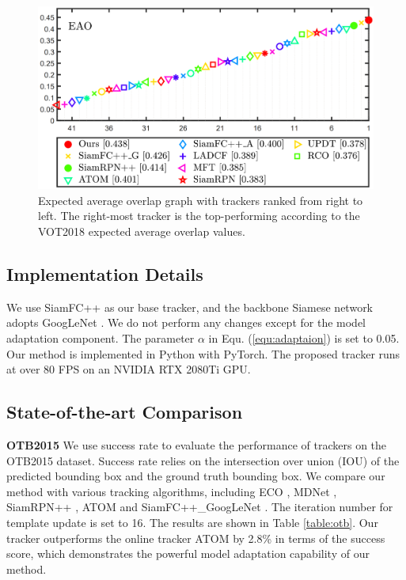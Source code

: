 \begin{figure}[t]
    \centering
    \includegraphics[width=1.0\textwidth]{Img/MTP/vot18/vot18_eao.png}
    \caption{Expected average overlap graph with trackers ranked from right to left. The right-most tracker is the top-performing according to the VOT2018 expected average overlap values.}
    \label{fig:eao}
\end{figure}

\subsection{Implementation Details}
We use SiamFC++ \cite{SiamFC++} as our base tracker, and the backbone Siamese network adopts GoogLeNet \cite{szegedy2015going}. We do not perform any changes except for the model adaptation component. The parameter $\alpha$ in Equ. (\ref{equ:adaptaion}) is set to 0.05. Our method is implemented in Python with PyTorch. The proposed tracker runs at over 80 FPS on an NVIDIA RTX 2080Ti GPU.

\subsection{State-of-the-art Comparison}
\textbf{OTB2015} We use success rate to evaluate the performance of trackers on the OTB2015 dataset. Success rate relies on the intersection over union (IOU) of the predicted bounding box and the ground truth bounding box. We compare our method with various tracking algorithms, including ECO \cite{danelljan2017eco}, MDNet \cite{nam2016learning}, SiamRPN++ \cite{li2019siamrpn++}, ATOM \cite{danelljan2019atom} and SiamFC++\_GoogLeNet \cite{SiamFC++}. The iteration number for template update is set to 16. The results are shown in Table \ref{table:otb}. Our tracker outperforms the online tracker ATOM by 2.8\% in terms of the success score, which demonstrates the powerful model adaptation capability of our method.


